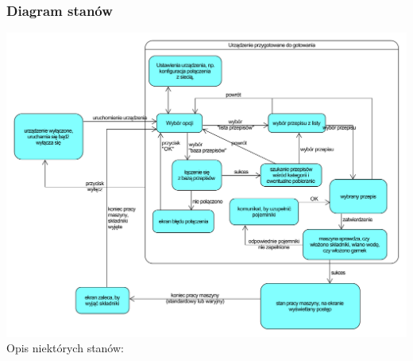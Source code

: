 \documentclass[12pt,a4paper,notitlepage]{article}
\begin{document}
\subsubsection{Diagram stanów}
\includegraphics[width=\textwidth,height=\textheight,keepaspectratio=true]{Diagram-stanow-interfejs.pdf}\\
\small
Opis niektórych stanów:
\end{document}
